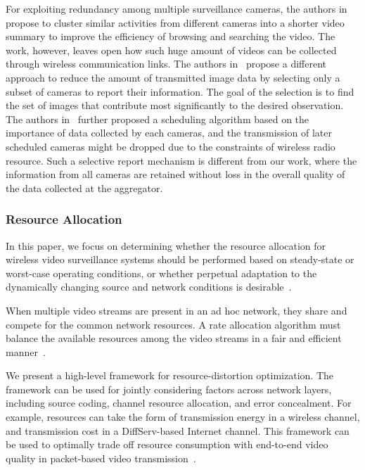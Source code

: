 For exploiting redundancy among multiple surveillance cameras, the authors in~\cite{ClusteredSynopsis} propose to cluster similar activities from different cameras into a shorter video summary to improve the efficiency of browsing and searching the video.
The work, however, leaves open how such huge amount of videos can be collected through wireless communication links.
The authors in~\cite{CameraSelection} propose a different approach to reduce the amount of transmitted image data by selecting only a subset of cameras to report their information.
The goal of the selection is to find the set of images that contribute most significantly to the desired observation.
The authors in~\cite{CorrAwareScheduling} further proposed a scheduling algorithm based on the importance of data collected by each cameras, and the transmission of later scheduled cameras might be dropped due to the constraints of wireless radio resource.
Such a selective report mechanism is different from our work, where the information from all cameras are retained without loss in the overall quality of the data collected at the aggregator.
%
\subsubsection{Resource Allocation}
In this paper, we focus on determining whether the resource allocation for wireless video surveillance systems should be performed based on steady-state or worst-case operating conditions, or whether perpetual adaptation to the dynamically changing source and network conditions is desirable~\cite{MWSNresourceAllocation}.

When multiple video streams are present in an ad hoc network, they share and compete for the common network resources. A rate allocation algorithm must balance the available resources among the video streams in a fair and efficient manner~\cite{rateAllocationForVideo}.

We present a high-level framework for resource-distortion optimization. The framework can be used for jointly considering factors across network layers, including source coding, channel resource allocation, and error concealment. For example, resources can take the form of transmission energy in a wireless channel, and transmission cost in a DiffServ-based Internet channel. This framework can be used to optimally trade off resource consumption with end-to-end video quality in packet-based video transmission~\cite{efficientRAforVideo}.


